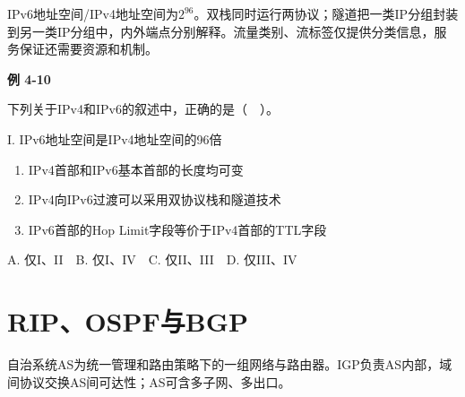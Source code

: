 IPv6地址空间/IPv4地址空间为\(2^{96}\)。双栈同时运行两协议；隧道把一类IP分组封装到另一类IP分组中，内外端点分别解释。流量类别、流标签仅提供分类信息，服务保证还需要资源和机制。

\par\medskip{}\noindent\hypertarget{CN04-E09}{}\label{CN04-E09}\textbf{例 4-10}\par\nobreak\smallskip

下列关于IPv4和IPv6的叙述中，正确的是（　）。

I. IPv6地址空间是IPv4地址空间的96倍

\begin{enumerate}
\def\labelenumi{\Roman{enumi}.}
\setcounter{enumi}{1}
\item
  IPv4首部和IPv6基本首部的长度均可变
\item
  IPv4向IPv6过渡可以采用双协议栈和隧道技术
\item
  IPv6首部的Hop Limit字段等价于IPv4首部的TTL字段
\end{enumerate}

A. 仅I、II　B. 仅I、IV　C. 仅II、III　D. 仅III、IV

\section{RIP、OSPF与BGP}\label{CN04-routing-protocols}

自治系统AS为统一管理和路由策略下的一组网络与路由器。IGP负责AS内部，域间协议交换AS间可达性；AS可含多子网、多出口。

